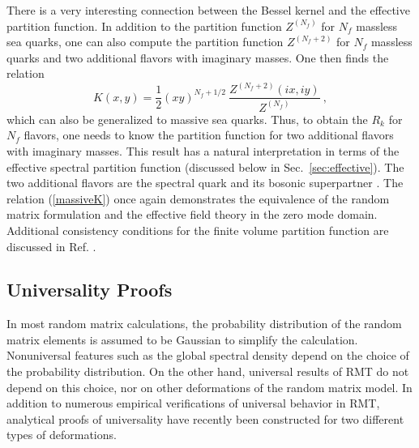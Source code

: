There is a very interesting connection between the Bessel kernel and
the effective partition function.  In addition to the partition
function $Z^{(N_f)}$ for $N_f$ massless sea quarks, one can also
compute the partition function $Z^{(N_f+2)}$ for $N_f$ massless quarks
and two additional flavors with imaginary masses.  One then finds the
relation \cite{Damg98a}
\begin{equation}
  \label{massiveK}
  K(x,y)=\frac{1}{2}(xy)^{N_f+1/2}\:\frac{Z^{(N_f+2)}(ix,iy)}{Z^{(N_f)}}\:,
\end{equation}
which can also be generalized to massive sea quarks.  Thus, to obtain the
$R_k$ for $N_f$ flavors, one needs to know the partition function
for two additional flavors with imaginary masses.  This result has a
natural interpretation in terms of the effective spectral partition
function (discussed below in Sec.~\ref{sec:effective}).  The two
additional flavors are the spectral quark and its bosonic superpartner
\cite{OTV}.  The relation (\ref{massiveK}) once again demonstrates the
equivalence of the random matrix formulation and the effective field
theory in the zero mode domain. Additional consistency conditions for
the finite volume partition function are discussed in Ref.
\cite{Akeconsist}.


\subsection{Universality Proofs}
\label{UniversalityProofs}

In most random matrix calculations, the probability distribution of
the random matrix elements is assumed to be Gaussian
to simplify the calculation.  Nonuniversal
features such as the global spectral density depend on the choice of
the probability distribution.  On the other hand, universal results of
RMT do not depend on this choice, nor on other deformations of the
random matrix model.  In addition to numerous empirical verifications
of universal behavior in RMT, analytical proofs of universality have
recently been constructed for two different types of deformations.

